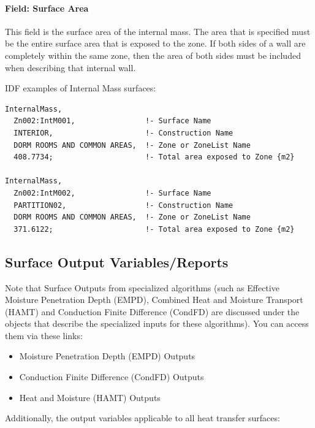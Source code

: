 \paragraph{Field: Surface Area}\label{field-surface-area}

This field is the surface area of the internal mass. The area that is specified must be the entire surface area that is exposed to the zone. If both sides of a wall are completely within the same zone, then the area of both sides must be included when describing that internal wall.

IDF examples of Internal Mass surfaces:

\begin{lstlisting}
InternalMass,
  Zn002:IntM001,                !- Surface Name
  INTERIOR,                     !- Construction Name
  DORM ROOMS AND COMMON AREAS,  !- Zone or ZoneList Name
  408.7734;                     !- Total area exposed to Zone {m2}

InternalMass,
  Zn002:IntM002,                !- Surface Name
  PARTITION02,                  !- Construction Name
  DORM ROOMS AND COMMON AREAS,  !- Zone or ZoneList Name
  371.6122;                     !- Total area exposed to Zone {m2}
\end{lstlisting}

\subsection{Surface Output Variables/Reports}\label{surface-output-variablesreports}

Note that Surface Outputs from specialized algorithms (such as Effective Moisture Penetration Depth (EMPD), Combined Heat and Moisture Transport (HAMT) and Conduction Finite Difference (CondFD) are discussed under the objects that describe the specialized inputs for these algorithms). You can access them via these links:

\begin{itemize}
\tightlist
\item
  Moisture Penetration Depth (EMPD) Outputs
\item
  Conduction Finite Difference (CondFD) Outputs
\item
  Heat and Moisture (HAMT) Outputs
\end{itemize}

Additionally, the output variables applicable to all heat transfer surfaces:

